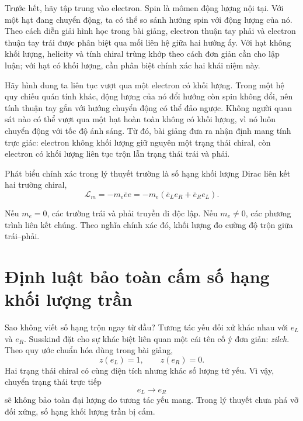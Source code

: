 Trước hết, hãy tập trung vào electron. Spin là mômen động lượng nội tại. Với một hạt đang chuyển động, ta có thể so sánh hướng spin với động lượng của nó. Theo cách diễn giải hình học trong bài giảng, electron thuận tay phải và electron thuận tay trái được phân biệt qua mối liên hệ giữa hai hướng ấy. Với hạt không khối lượng, helicity và tính chiral trùng khớp theo cách đơn giản cần cho lập luận; với hạt có khối lượng, cần phân biệt chính xác hai khái niệm này.

Hãy hình dung ta liên tục vượt qua một electron có khối lượng. Trong một hệ quy chiếu quán tính khác, động lượng của nó đổi hướng còn spin không đổi, nên tính thuận tay gắn với hướng chuyển động có thể đảo ngược. Không người quan sát nào có thể vượt qua một hạt hoàn toàn không có khối lượng, vì nó luôn chuyển động với tốc độ ánh sáng. Từ đó, bài giảng đưa ra nhận định mang tính trực giác: electron không khối lượng giữ nguyên một trạng thái chiral, còn electron có khối lượng liên tục trộn lẫn trạng thái trái và phải.

Phát biểu chính xác trong lý thuyết trường là số hạng khối lượng Dirac liên kết hai trường chiral,
\begin{equation}
\mathcal L_m
=
-m_e\bar e e
=
-m_e
\left(
  \bar e_L e_R
  +
  \bar e_R e_L
\right).
\end{equation}

Nếu $m_e=0$, các trường trái và phải truyền đi độc lập. Nếu $m_e\ne0$, các phương trình liên kết chúng. Theo nghĩa chính xác đó, khối lượng đo cường độ trộn giữa trái--phải.

\section{Định luật bảo toàn cấm số hạng khối lượng trần}

Sao không viết số hạng trộn ngay từ đầu? Tương tác yếu đối xử khác nhau với $e_L$ và $e_R$. Susskind đặt cho sự khác biệt liên quan một cái tên cố ý đơn giản: \emph{zilch}. Theo quy ước chuẩn hóa dùng trong bài giảng,
\begin{equation}
z(e_L)=1,
\qquad
z(e_R)=0.
\end{equation}
Hai trạng thái chiral có cùng điện tích nhưng khác số lượng tử yếu. Vì vậy, chuyển trạng thái trực tiếp
\begin{equation}
e_L\longrightarrow e_R
\end{equation}
sẽ không bảo toàn đại lượng do tương tác yếu mang. Trong lý thuyết chưa phá vỡ đối xứng, số hạng khối lượng trần bị cấm.


